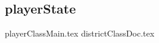 \subsection{playerState}
\label{ss:playerState}

{playerClassMain.tex}
\newpage
{districtClassDoc.tex}